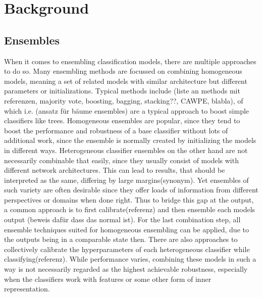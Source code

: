 \chapter{Background}
\label{chap:background}



\section{Ensembles}
\label{sec:ensembles}

When it comes to ensembling classification models, there are multiple approaches to do so. Many ensembling methods are focussed on combining homogeneous 
models, meaning a set of related models with similar architecture but different parameters or initializations. Typical methods include 
(liste an methods mit referenzen, majority vote, boosting, bagging, stacking??, CAWPE, blabla), of which i.e. (ansatz für bäume ensembles) are a typical approach to boost simple 
classifiers like trees. Homogeneous ensembles are popular, since they tend to boost the performance and robustness of a base classifier without lots 
of additional work, since the ensemble is normally created by initializing the models in different ways.
Heterogeneous classifier ensembles on the other hand are not necessarily combinable that easily, since they usually consist of models with 
different network architectures. This can lead to results, that should be interpreted as the same, differing by large margins(synonym). Yet 
ensembles of such variety are often desirable since they offer loads of information from different perspectives or domains when done right. 
Thus to bridge this gap at the output, a common approach is to first calibrate(referenz) and then ensemble each models 
output (beweis dafür dass das normal ist). For the last combination step, all ensemble techniques suited for homogeneous ensembling can 
be applied, due to the outputs being in a comparable state then. There are also approaches to collectively calibrate the hyperparameters 
of each heterogeneous classifier while classifying(referenz). While performance varies, combining 
these models in such a way is not necessarily regarded as the highest achievable robustness, especially when the classifiers work with features or some other form of inner representation. 
